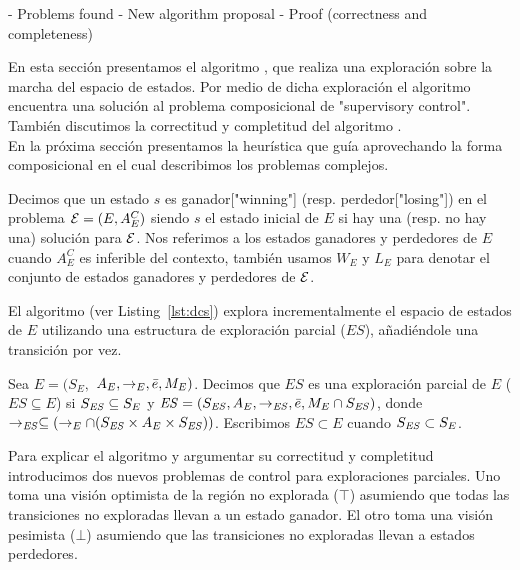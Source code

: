 - Problems found
- New algorithm proposal
- Proof (correctness and completeness)

En esta sección presentamos el algoritmo \DCS, que realiza una exploración sobre la marcha del espacio de estados. Por medio de dicha exploración el algoritmo encuentra una solución al problema composicional de "supervisory control". También discutimos la correctitud y completitud del algoritmo \DCS. \\
En la próxima sección presentamos la heurística que guía \DCS aprovechando la forma composicional en el cual describimos los problemas complejos.





\begin{notation}
Decimos que un estado $s$ es ganador["winning"] (resp. perdedor["losing"]) en el problema $\mathcal{E} = 
(E, A_E^C)$ siendo $s$ el estado inicial de $E$ si hay una (resp. no hay una) solución para $\mathcal{E}$. Nos referimos a los estados ganadores y perdedores de $E$ cuando $A_E^C$ es inferible del contexto, también usamos $W_E$ y $L_E$ para denotar el conjunto de estados ganadores y perdedores de $\mathcal{E}$.
\end{notation}

El algoritmo (ver Listing~\ref{lst:dcs}) explora incrementalmente el espacio de estados de $E$ utilizando una estructura de exploración parcial ($ES$), añadiéndole una transición por vez.


\begin{definition}
 \label{def:unexploredTo}
Sea $E = (S_E,$ $A_E, \rightarrow_E, \bar{e}, M_E)$. Decimos que $ES$ es una exploración parcial de $E$ ($ES \subseteq E$) si $S_{\mathit{ES}} \subseteq 
S_E$ y $\mathit{ES} = (S_{\mathit{ES}},A_E, \rightarrow_{\mathit{ES}},\bar{e},M_E 
\cap S_{\mathit{ES}})$, donde $ \rightarrow_{\mathit{ES}} \subseteq (\rightarrow_E \cap 
(S_{\mathit{ES}} \times A_E \times S_{\mathit{ES}}))$. Escribimos $ES \subset E$ cuando $S_{\mathit{ES}} \subset S_E$.
\end{definition}

Para explicar el algoritmo y argumentar su correctitud y completitud introducimos dos nuevos problemas de control para exploraciones parciales. Uno toma una visión optimista de la región no explorada ($\top$) asumiendo que todas las transiciones no exploradas llevan a un estado ganador. El otro toma una visión pesimista ($\bot$) asumiendo que las transiciones no exploradas llevan a estados perdedores.

